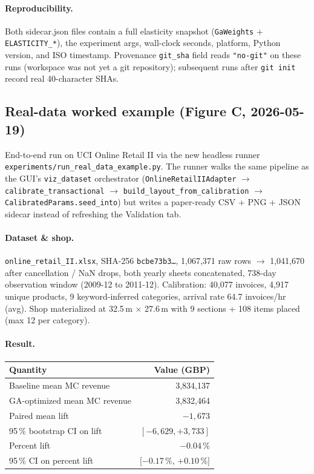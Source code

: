 \documentclass[11pt]{article}
\begin{document}
\paragraph{Reproducibility.}
Both sidecar.json files contain a full elasticity snapshot
(\texttt{GaWeights} + \texttt{ELASTICITY\_*}), the experiment args,
wall-clock seconds, platform, Python version, and ISO timestamp.
Provenance \texttt{git\_sha} field reads \texttt{"no-git"} on these
runs (workspace was not yet a git repository); subsequent runs after
\texttt{git init} record real 40-character SHAs.

\subsection{Real-data worked example (Figure C, 2026-05-19)}

End-to-end run on UCI Online Retail II via the new headless runner
\texttt{experiments/run\_real\_data\_example.py}. The runner walks
the same pipeline as the GUI's \texttt{viz\_dataset} orchestrator
(\texttt{OnlineRetailIIAdapter} $\rightarrow$
\texttt{calibrate\_transactional} $\rightarrow$
\texttt{build\_layout\_from\_calibration} $\rightarrow$
\texttt{CalibratedParams.seed\_into}) but writes a paper-ready
CSV + PNG + JSON sidecar instead of refreshing the Validation tab.

\paragraph{Dataset \& shop.}
\texttt{online\_retail\_II.xlsx},
SHA-256 \texttt{bcbe73b3\dots},
1{,}067{,}371 raw rows
$\rightarrow$ 1{,}041{,}670 after cancellation / NaN drops,
both yearly sheets concatenated, 738-day observation window
(2009-12 to 2011-12). Calibration: 40{,}077 invoices, 4{,}917 unique
products, 9 keyword-inferred categories, arrival rate 64.7
invoices/hr (avg). Shop materialized at 32.5\,m $\times$ 27.6\,m
with 9 sections + 108 items placed (max 12 per category).

\paragraph{Result.}

\begin{center}
\begin{tabular}{lr}
\hline
Quantity & Value (GBP) \\
\hline
Baseline mean MC revenue           & 3{,}834{,}137 \\
GA-optimized mean MC revenue       & 3{,}832{,}464 \\
Paired mean lift                   & $-1{,}673$ \\
95\,\% bootstrap CI on lift        & $[-6{,}629, +3{,}733]$ \\
Percent lift                       & $-0.04$\,\% \\
95\,\% CI on percent lift          & $[-0.17$\,\%, $+0.10$\,\%$]$ \\
\hline
\end{tabular}
\end{center}
\end{document}
